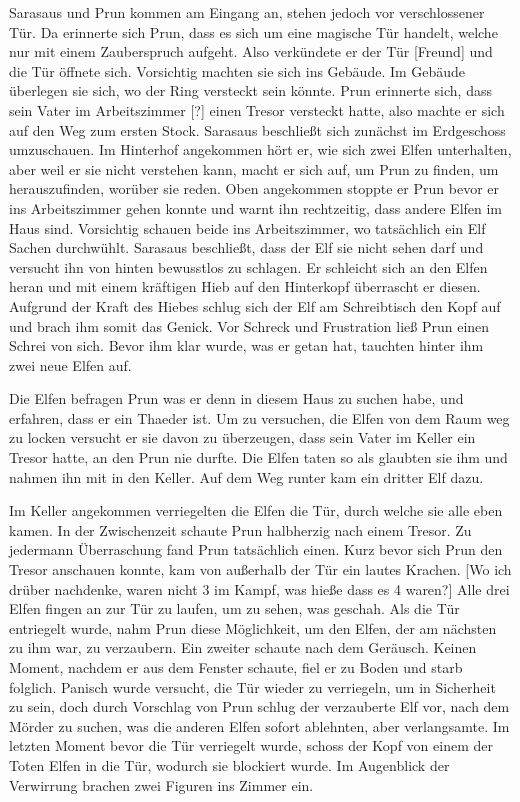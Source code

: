 \documentclass[10pt,twoside,twocolumn,openany]{book}
\begin{document}
	Sarasaus und Prun kommen am Eingang an, stehen jedoch vor verschlossener Tür. Da erinnerte sich Prun, dass es sich um eine magische Tür handelt, welche nur mit einem Zauberspruch aufgeht. Also verkündete er der Tür [Freund] und die Tür öffnete sich. Vorsichtig machten sie sich ins Gebäude. Im Gebäude überlegen sie sich, wo der Ring versteckt sein könnte. Prun erinnerte sich, dass sein Vater im Arbeitszimmer [?] einen Tresor versteckt hatte, also machte er sich auf den Weg zum ersten Stock. Sarasaus beschließt sich zunächst im Erdgeschoss umzuschauen. Im Hinterhof angekommen hört er, wie sich zwei Elfen unterhalten, aber weil er sie nicht verstehen kann, macht er sich auf, um Prun zu finden, um herauszufinden, worüber sie reden. Oben angekommen stoppte er Prun bevor er ins Arbeitszimmer gehen konnte und warnt ihn rechtzeitig, dass andere Elfen im Haus sind. Vorsichtig schauen beide ins Arbeitszimmer, wo tatsächlich ein Elf Sachen durchwühlt. Sarasaus beschließt, dass der Elf sie nicht sehen darf und versucht ihn von hinten bewusstlos zu schlagen. Er schleicht sich an den Elfen heran und mit einem kräftigen Hieb auf den Hinterkopf überrascht er diesen. Aufgrund der Kraft des Hiebes schlug sich der Elf am Schreibtisch den Kopf auf und brach ihm somit das Genick. Vor Schreck und Frustration ließ Prun einen Schrei von sich. Bevor ihm klar wurde, was er getan hat, tauchten hinter ihm zwei neue Elfen auf. 
	
	Die Elfen befragen Prun was er denn in diesem Haus zu suchen habe, und erfahren, dass er ein Thaeder ist. Um zu versuchen, die Elfen von dem Raum weg zu locken versucht er sie davon zu überzeugen, dass sein Vater im Keller ein Tresor hatte, an den Prun nie durfte. Die Elfen taten so als glaubten sie ihm und nahmen ihn mit in den Keller. Auf dem Weg runter kam ein dritter Elf dazu.
	
	Im Keller angekommen verriegelten die Elfen die Tür, durch welche sie alle eben kamen. In der Zwischenzeit schaute Prun halbherzig nach einem Tresor. Zu jedermann Überraschung fand Prun tatsächlich einen. Kurz bevor sich Prun den Tresor anschauen konnte, kam von außerhalb der Tür ein lautes Krachen. [Wo ich drüber nachdenke, waren nicht 3 im Kampf, was hieße dass es 4 waren?] Alle drei Elfen fingen an zur Tür zu laufen, um zu sehen, was geschah. Als die Tür entriegelt wurde, nahm Prun diese Möglichkeit, um den Elfen, der am nächsten zu ihm war, zu verzaubern. Ein zweiter schaute nach dem Geräusch. Keinen Moment, nachdem er aus dem Fenster schaute, fiel er zu Boden und starb folglich. Panisch wurde versucht, die Tür wieder zu verriegeln, um in Sicherheit zu sein, doch durch Vorschlag von Prun schlug der verzauberte Elf vor, nach dem Mörder zu suchen, was die anderen Elfen sofort ablehnten, aber verlangsamte. Im letzten Moment bevor die Tür verriegelt wurde, schoss der Kopf von einem der Toten Elfen in die Tür, wodurch sie blockiert wurde. Im Augenblick der Verwirrung brachen zwei Figuren ins Zimmer ein.
	
\end{document}
